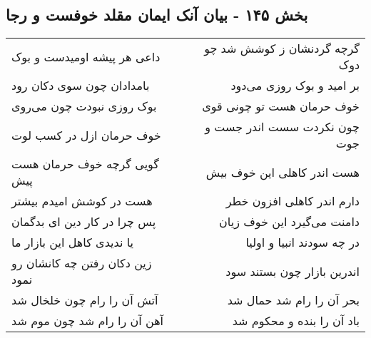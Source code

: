 \begin{center}
\section*{بخش ۱۴۵ - بیان آنک ایمان مقلد خوفست و رجا}
\label{sec:sh145}
\begin{longtable}{l p{0.5cm} r}
داعی هر پیشه اومیدست و بوک
&&
گرچه گردنشان ز کوشش شد چو دوک
\\
بامدادان چون سوی دکان رود
&&
بر امید و بوک روزی می‌دود
\\
بوک روزی نبودت چون می‌روی
&&
خوف حرمان هست تو چونی قوی
\\
خوف حرمان ازل در کسب لوت
&&
چون نکردت سست اندر جست و جوت
\\
گویی گرچه خوف حرمان هست پیش
&&
هست اندر کاهلی این خوف بیش
\\
هست در کوشش امیدم بیشتر
&&
دارم اندر کاهلی افزون خطر
\\
پس چرا در کار دین ای بدگمان
&&
دامنت می‌گیرد این خوف زیان
\\
یا ندیدی کاهل این بازار ما
&&
در چه سودند انبیا و اولیا
\\
زین دکان رفتن چه کانشان رو نمود
&&
اندرین بازار چون بستند سود
\\
آتش آن را رام چون خلخال شد
&&
بحر آن را رام شد حمال شد
\\
آهن آن را رام شد چون موم شد
&&
باد آن را بنده و محکوم شد
\\
\end{longtable}
\end{center}
